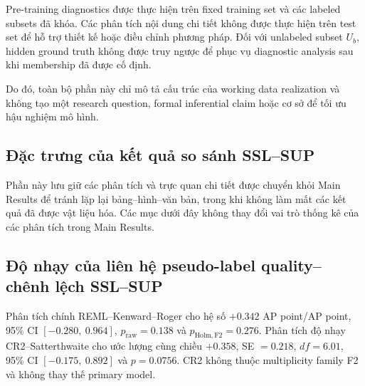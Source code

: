 \documentclass[pdflatex,sn-mathphys-num]{sn-jnl}%
\theoremstyle{thmstyleone}%
\theoremstyle{thmstyletwo}%
\theoremstyle{thmstylethree}%
\begin{document}
Pre-training diagnostics được thực hiện trên fixed training set và các labeled subsets đã khóa. Các phân tích nội dung chi tiết không được thực hiện trên test set để hỗ trợ thiết kế hoặc điều chỉnh phương pháp. Đối với unlabeled subset \(U_b\), hidden ground truth không được truy ngược để phục vụ diagnostic analysis sau khi membership đã được cố định.

Do đó, toàn bộ phần này chỉ mô tả cấu trúc của working data realization và không tạo một research question, formal inferential claim hoặc cơ sở để tối ưu hậu nghiệm mô hình.


\subsection{Đặc trưng của kết quả so sánh SSL--SUP}
\label{sec:supp_sq2}

Phần này lưu giữ các phân tích và trực quan chi tiết được chuyển khỏi Main Results để tránh lặp lại bảng--hình--văn bản, trong khi không làm mất các kết quả đã được vật liệu hóa. Các mục dưới đây không thay đổi vai trò thống kê của các phân tích trong Main Results.

\subsection{Độ nhạy của liên hệ pseudo-label quality--chênh lệch SSL--SUP}

Phân tích chính REML--Kenward--Roger cho hệ số $+0.342$ AP point/AP point, 95\% CI $[-0.280,\ 0.964]$, $p_{\mathrm{raw}}=0.138$ và $p_{\mathrm{Holm,F2}}=0.276$. Phân tích độ nhạy CR2--Satterthwaite cho ước lượng cùng chiều $+0.358$, SE $=0.218$, $df=6.01$, 95\% CI $[-0.175,\ 0.892]$ và $p=0.0756$. CR2 không thuộc multiplicity family F2 và không thay thế primary model.

\begin{table}[htbp]
\centering
\caption{Primary và sensitivity estimates cho pseudo-label association.}
\label{tab:supp_sq2_qpseudo}
\small
\setlength{\tabcolsep}{4pt}
\end{table}
\end{document}
